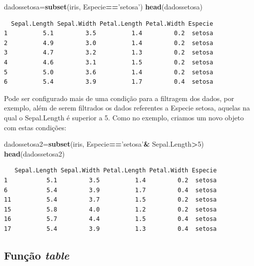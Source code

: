 \documentclass[12pt,portuguese,oneside]{book}
\newenvironment{Shaded}{\begin{snugshade}}{\end{snugshade}}
\newcommand{\KeywordTok}[1]{\textcolor[rgb]{0.13,0.29,0.53}{\textbf{#1}}}
\newcommand{\DecValTok}[1]{\textcolor[rgb]{0.00,0.00,0.81}{#1}}
\newcommand{\StringTok}[1]{\textcolor[rgb]{0.31,0.60,0.02}{#1}}
\newcommand{\OperatorTok}[1]{\textcolor[rgb]{0.81,0.36,0.00}{\textbf{#1}}}
\newcommand{\NormalTok}[1]{#1}
\begin{document}
\begin{Shaded}
\begin{Highlighting}[]
\NormalTok{dadossetosa=}\KeywordTok{subset}\NormalTok{(iris, Especie}\OperatorTok{==}\StringTok{'setosa'}\NormalTok{)}
\KeywordTok{head}\NormalTok{(dadossetosa)}
\end{Highlighting}
\end{Shaded}

\begin{verbatim}
  Sepal.Length Sepal.Width Petal.Length Petal.Width Especie
1          5.1         3.5          1.4         0.2  setosa
2          4.9         3.0          1.4         0.2  setosa
3          4.7         3.2          1.3         0.2  setosa
4          4.6         3.1          1.5         0.2  setosa
5          5.0         3.6          1.4         0.2  setosa
6          5.4         3.9          1.7         0.4  setosa
\end{verbatim}

Pode ser configurado mais de uma condição para a filtragem dos dados,
por exemplo, além de serem filtrados os dados referentes a Especie
setosa, aquelas na qual o Sepal.Length é superior a 5. Como no exemplo,
criamos um novo objeto com estas condições:

\begin{Shaded}
\begin{Highlighting}[]
\NormalTok{dadossetosa2=}\KeywordTok{subset}\NormalTok{(iris, Especie}\OperatorTok{==}\StringTok{'setosa'}\OperatorTok{&}\StringTok{ }\NormalTok{Sepal.Length}\OperatorTok{>}\DecValTok{5}\NormalTok{)}
\KeywordTok{head}\NormalTok{(dadossetosa2)}
\end{Highlighting}
\end{Shaded}

\begin{verbatim}
   Sepal.Length Sepal.Width Petal.Length Petal.Width Especie
1           5.1         3.5          1.4         0.2  setosa
6           5.4         3.9          1.7         0.4  setosa
11          5.4         3.7          1.5         0.2  setosa
15          5.8         4.0          1.2         0.2  setosa
16          5.7         4.4          1.5         0.4  setosa
17          5.4         3.9          1.3         0.4  setosa
\end{verbatim}

\subsection{\texorpdfstring{Função
\emph{table}}{Função table}}\label{funcao-table}
\end{document}
